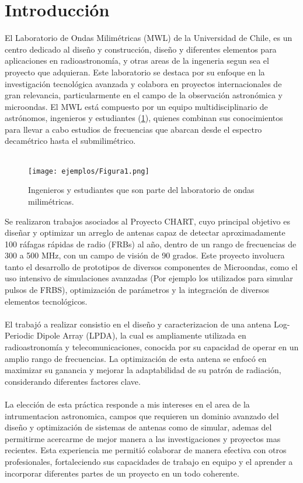 \section{Introducción}
El Laboratorio de Ondas Milimétricas (MWL) de la Universidad de Chile, es un centro dedicado al diseño y construcción, diseño y diferentes elementos para aplicaciones en radioastronomía, y otras areas de la ingeneria segun sea el proyecto que adquieran. Este laboratorio se destaca por su enfoque en la investigación tecnológica avanzada y colabora en proyectos internacionales de gran relevancia, particularmente en el campo de la observación astronómica y microondas. El MWL está compuesto por un equipo multidisciplinario de astrónomos, ingenieros y estudiantes (\ref{fig:personas_lab}), quienes combinan sus conocimientos para llevar a cabo estudios de frecuencias que abarcan desde el espectro decamétrico hasta el submilimétrico.\\\\
\begin{figure}
	\centering
	\texttt{[image: ejemplos/Figura1.png]}
	\caption{Ingenieros y estudiantes que son parte del laboratorio de ondas milimétricas.}
	\label{fig:personas_lab}
\end{figure}
Se realizaron trabajos asociados al  Proyecto CHART, cuyo principal objetivo es diseñar y optimizar un arreglo de antenas capaz de detectar aproximadamente 100 ráfagas rápidas de radio (FRBs) al año, dentro de un rango de frecuencias de 300 a 500 MHz, con un campo de visión de 90 grados. Este proyecto involucra tanto el desarrollo de prototipos de diversos componentes de Microondas, como el uso intensivo de simulaciones avanzadas (Por ejemplo los utilizados para simular pulsos de FRBS), optimización de parámetros y la integración de diversos elementos tecnológicos.\\\\
El trabajó a realizar consistio en el diseño y caracterizacion de una antena Log-Periodic Dipole Array (LPDA), la cual es ampliamente utilizada en radioastronomía y telecomunicaciones, conocida por su capacidad de operar en un amplio rango de frecuencias. La optimización de esta antena se enfocó en maximizar su ganancia y mejorar la adaptabilidad de su patrón de radiación, considerando diferentes factores clave.\\\\
La elección de esta práctica responde a mis intereses en el area de la intrumentacion astronomica, campos que requieren un dominio avanzado del diseño y optimización de sistemas de antenas como de simular, ademas del permitirme acercarme de mejor manera a las investigaciones y proyectos mas recientes. Esta experiencia me permitió colaborar de manera efectiva con otros profesionales, fortaleciendo sus capacidades de trabajo en equipo y el aprender a incorporar diferentes partes de un proyecto en un todo coherente.\\\\
\newpage
